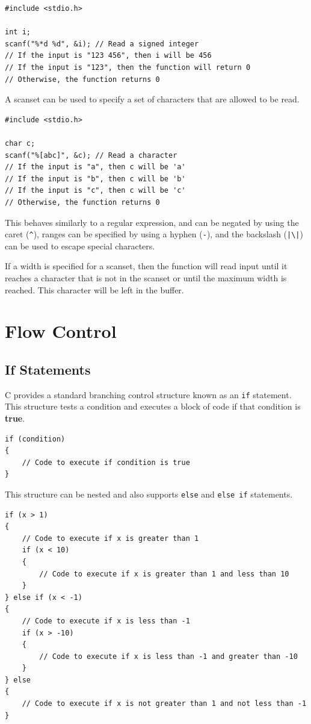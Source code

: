 \documentclass{report}
\begin{document}
\begin{verbatim}
#include <stdio.h>

int i;
scanf("%*d %d", &i); // Read a signed integer
// If the input is "123 456", then i will be 456
// If the input is "123", then the function will return 0
// Otherwise, the function returns 0
\end{verbatim}
A scanset can be used to specify a set of characters that are allowed to be read.
\begin{verbatim}
#include <stdio.h>

char c;
scanf("%[abc]", &c); // Read a character
// If the input is "a", then c will be 'a'
// If the input is "b", then c will be 'b'
// If the input is "c", then c will be 'c'
// Otherwise, the function returns 0
\end{verbatim}
This behaves similarly to a regular expression, and can be negated by using the caret (\texttt{^}),
ranges can be specified by using a hyphen (\texttt{-}), and the backslash (\texttt{|\backslash|}) can be used to escape special characters.

If a width is specified for a scanset, then the function will read input until it reaches a character that is not in the scanset or until the maximum width is reached. This
character will be left in the buffer.
\chapter{Flow Control}
\section{If Statements}
C provides a standard branching control structure known as an \texttt{if} statement.
This structure tests a condition and executes a block of code if that condition is \textbf{true}.
\begin{verbatim}
if (condition)
{
    // Code to execute if condition is true
}
\end{verbatim}
This structure can be nested and also supports \texttt{else} and \texttt{else if} statements.
\begin{verbatim}
if (x > 1)
{
    // Code to execute if x is greater than 1
    if (x < 10)
    {
        // Code to execute if x is greater than 1 and less than 10
    }
} else if (x < -1)
{
    // Code to execute if x is less than -1
    if (x > -10)
    {
        // Code to execute if x is less than -1 and greater than -10
    }
} else
{
    // Code to execute if x is not greater than 1 and not less than -1
}
\end{verbatim}
\end{document}
